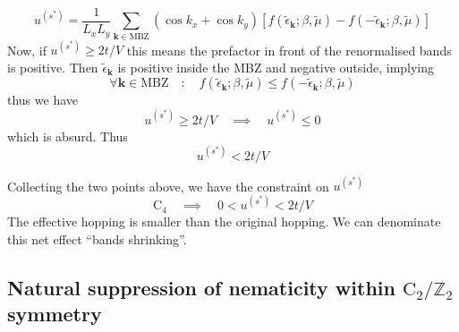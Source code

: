 \begin{enumerate}
	\[
	u^{(s^*)} = \frac{1}{L_x L_y} \sum_{\mathbf{k}\in\mathrm{MBZ}} (\cos k_x + \cos k_y) \left[
	f(\tilde{\epsilon}_\mathbf{k};\beta,\tilde{\mu}) - f(-\tilde{\epsilon}_\mathbf{k};\beta,\tilde{\mu})
	\right]
	\]
	Now, if $u^{(s^*)} \ge 2t/V$ this means the prefactor in front of the renormalised bands is positive. Then $\tilde{\epsilon}_\mathbf{k}$ is positive inside the MBZ and negative outside, implying
	\[
	\forall \mathbf{k} \in \mathrm{MBZ}
	\quad\colon\quad
	f(\tilde{\epsilon}_\mathbf{k};\beta,\tilde{\mu}) \le f(-\tilde{\epsilon}_\mathbf{k};\beta,\tilde{\mu})
	\]
	thus we have
	\[
	u^{(s^*)} \ge 2t/V
	\quad\implies\quad
	u^{(s^*)} \le 0
	\]
	which is absurd. Thus
	\[
	u^{(s^*)} < 2t/V
	\]
\end{enumerate}
Collecting the two points above, we have the constraint on $u^{(s^*)}$
\begin{equation}\label{eq:normal-us*-constraint}
	\mathrm{C}_4
	\quad\implies\quad
	0 < u^{(s^*)} < 2t/V
\end{equation}
The effective hopping is smaller than the original hopping. We can denominate this net effect ``bands shrinking''.

\subsection{Natural suppression of nematicity within $\mathrm{C}_2/\mathbb{Z}_2$ symmetry}\label{subsec:normal-bands-shrinking-C2}

